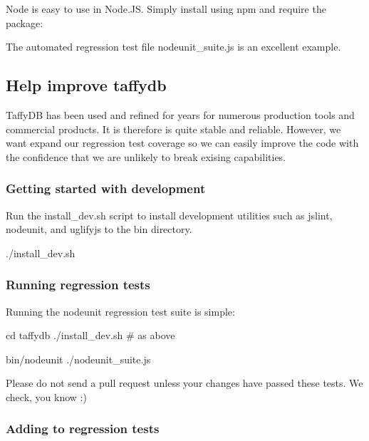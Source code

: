 Node is easy to use in Node.\+JS. Simply install using {\ttfamily npm} and {\ttfamily require} the package\+:




The automated regression test file {\ttfamily nodeunit\+\_\+suite.\+js} is an excellent example.

\subsection*{Help improve taffydb}

Taffy\+DB has been used and refined for years for numerous production tools and commercial products. It is therefore is quite stable and reliable. However, we want expand our regression test coverage so we can easily improve the code with the confidence that we are unlikely to break exising capabilities.

\subsubsection*{Getting started with development}

Run the {\ttfamily install\+\_\+dev.\+sh} script to install development utilities such as {\ttfamily jslint}, {\ttfamily nodeunit}, and {\ttfamily uglifyjs} to the {\ttfamily bin} directory.


\begin{DoxyCode}
./install\_dev.sh
\end{DoxyCode}


\subsubsection*{Running regression tests}

Running the nodeunit regression test suite is simple\+:


\begin{DoxyCode}
cd taffydb
./install\_dev.sh # as above

bin/nodeunit ./nodeunit\_suite.js
\end{DoxyCode}


Please do not send a pull request unless your changes have passed these tests. We check, you know \+:)

\subsubsection*{Adding to regression tests}

